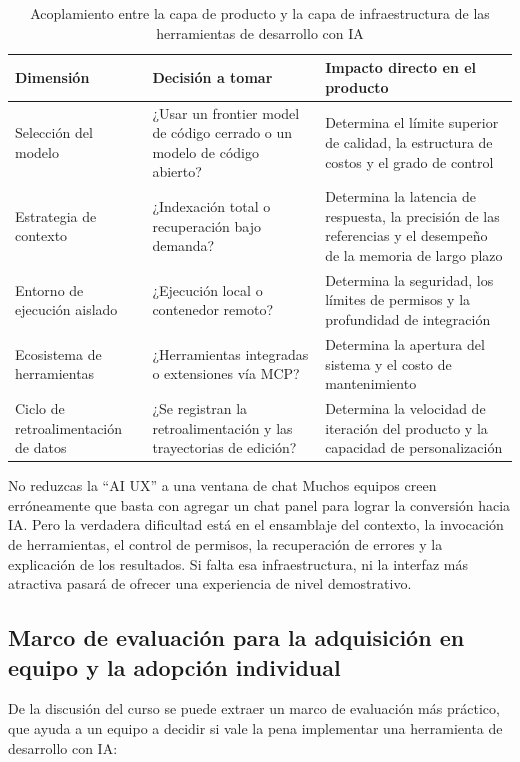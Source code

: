 \begin{table}[H]
\centering
\begin{tabular}{p{} p{} p{}}
\toprule
Dimensión & Decisión a tomar & Impacto directo en el producto \\
\midrule
Selección del modelo & ¿Usar un frontier model de código cerrado o un modelo de código abierto? & Determina el límite superior de calidad, la estructura de costos y el grado de control \\
Estrategia de contexto & ¿Indexación total o recuperación bajo demanda? & Determina la latencia de respuesta, la precisión de las referencias y el desempeño de la memoria de largo plazo \\
Entorno de ejecución aislado & ¿Ejecución local o contenedor remoto? & Determina la seguridad, los límites de permisos y la profundidad de integración \\
Ecosistema de herramientas & ¿Herramientas integradas o extensiones vía MCP? & Determina la apertura del sistema y el costo de mantenimiento \\
Ciclo de retroalimentación de datos & ¿Se registran la retroalimentación y las trayectorias de edición? & Determina la velocidad de iteración del producto y la capacidad de personalización \\
\bottomrule
\end{tabular}
\caption{Acoplamiento entre la capa de producto y la capa de infraestructura de las herramientas de desarrollo con IA}
\end{table}

\begin{warningbox}{No reduzcas la ``AI UX'' a una ventana de chat}
Muchos equipos creen erróneamente que basta con agregar un chat panel para lograr la conversión hacia IA. Pero la verdadera dificultad está en el ensamblaje del contexto, la invocación de herramientas, el control de permisos, la recuperación de errores y la explicación de los resultados. Si falta esa infraestructura, ni la interfaz más atractiva pasará de ofrecer una experiencia de nivel demostrativo.
\end{warningbox}

\subsection{Marco de evaluación para la adquisición en equipo y la adopción individual}

De la discusión del curso se puede extraer un marco de evaluación más práctico, que ayuda a un equipo a decidir si vale la pena implementar una herramienta de desarrollo con IA:


